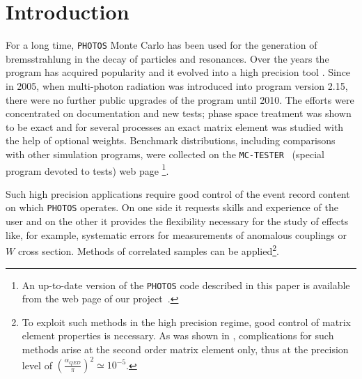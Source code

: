 \documentclass[]{Photos_interface_design}
\begin{document}
\maketitle

\tableofcontents{}

\newpage

\section{Introduction}
For a long time, {\tt PHOTOS} Monte Carlo \cite{Barberio:1990ms,Barberio:1993qi} 
has been used for the generation of bremsstrahlung in the decay of particles and resonances.
Over the years the program has acquired
popularity and it evolved into a high 
precision tool \cite{Golonka:2006tw}. Since in 2005, when
multi-photon radiation was 
introduced \cite{Golonka:2005pn} into program version 2.15, there were no 
further public upgrades 
of the program until 2010. The efforts were concentrated on documentation and 
new tests;
 phase space treatment was shown to be 
exact \cite{Nanava:2006vv} and for several 
processes \cite{Golonka:2006tw,Nanava:2006vv,Nanava:2009vg}
an exact matrix element was studied with the help of optional weights.
Benchmark distributions, including comparisons with  
other simulation programs, were collected on the {\tt MC-TESTER}~\cite{Davidson:2008ma} (special program devoted to tests) web page \cite{Photos_tests}%
\footnote{An up-to-date version of the {\tt PHOTOS} code described in this paper is
available from the web page of our project~\cite{photosC++}.}. 

 Such high precision applications require good control of the event record content on which {\tt PHOTOS} operates. On one side it 
requests skills and experience of the user and on the other it provides 
the flexibility necessary for the study of effects like, for example, systematic errors for 
measurements of anomalous couplings or $W$ cross section. Methods of 
correlated samples  can be applied\footnote{To exploit such methods in 
the high precision regime, good control of matrix element properties is necessary.
As was shown in \cite{Kleiss:1990jv}, complications for such methods arise at the second order matrix element only, thus at the precision level of 
$(\frac{\alpha_{QED}}{\pi})^2 \simeq 10^{-5}$.}. 
\end{document}
